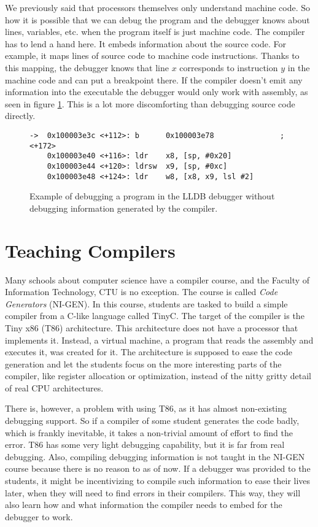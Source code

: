 We previously said that processors themselves only understand machine code. So
how it is possible that we can debug the program and the debugger knows about
lines, variables, etc. when the program itself is just machine code. The
compiler has to lend a hand here. It embeds information about the source code.
For example, it maps lines of source code to machine code instructions. Thanks
to this mapping, the debugger knows that line $x$ corresponds to instruction
$y$ in the machine code and can put a breakpoint there. If the compiler doesn't
emit any information into the executable the debugger would only work with
assembly, as seen in figure \ref{fig:lldb-debug2}. This is a lot more
discomforting than debugging source code directly.

\begin{figure}
\begin{lstlisting}
->  0x100003e3c <+112>: b      0x100003e78               ; <+172>
    0x100003e40 <+116>: ldr    x8, [sp, #0x20]
    0x100003e44 <+120>: ldrsw  x9, [sp, #0xc]
    0x100003e48 <+124>: ldr    w8, [x8, x9, lsl #2]
\end{lstlisting}
\caption{Example of debugging a program in the LLDB debugger without debugging
    information generated by the compiler.}
\label{fig:lldb-debug2}
\end{figure}

\section{Teaching Compilers}
Many schools about computer science have a compiler course, and the Faculty of
Information Technology, CTU is no exception. The course is called
\textit{Code Generators} (NI-GEN). In this course, students are tasked to build
a simple compiler from a C-like language called TinyC. The target of the
compiler is the Tiny x86 (T86) architecture. This architecture does not have a
processor that implements it. Instead, a virtual machine, a program that reads
the assembly and executes it, was created for it. The architecture is supposed
to ease the code generation and let the students focus on the more interesting
parts of the compiler, like register allocation or optimization, instead of the
nitty gritty detail of real CPU architectures.

There is, however, a problem with using T86, as it has almost non-existing
debugging support. So if a compiler of some student generates the code badly,
which is frankly inevitable, it takes a non-trivial amount of effort to find
the error. T86 has some very light debugging capability, but it is far from
real debugging. Also, compiling debugging information is not taught in the
NI-GEN course because there is no reason to as of now. If a debugger was
provided to the students, it might be incentivizing to compile such information
to ease their lives later, when they will need to find errors in their
compilers. This way, they will also learn how and what information the compiler
needs to embed for the debugger to work.

